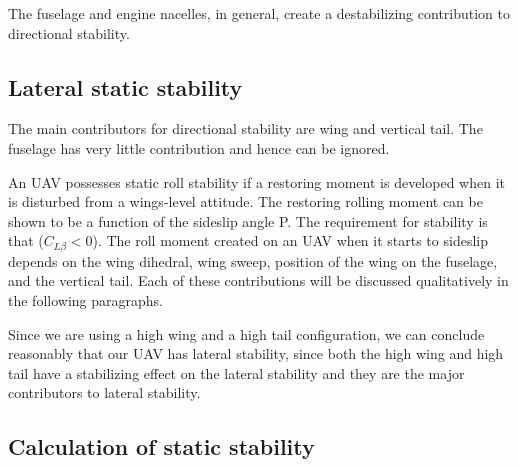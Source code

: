 \documentclass[12 pt]{article}
\begin{document}
{{The fuselage and engine nacelles, in general, create a destabilizing contribution to directional stability.

\subsection{Lateral static stability}

The main contributors for directional stability are wing and vertical tail. The fuselage has very little contribution and hence can be ignored.

An UAV possesses static roll stability if a restoring moment is developed when
it is disturbed from a wings-level attitude. The restoring rolling moment can be shown to be a function of the sideslip angle P. The requirement for stability is that ($C_{L\beta} < 0$). The roll moment created on an UAV when it starts to sideslip depends on the wing dihedral, wing sweep, position of the wing on the fuselage, and the vertical tail. Each of these contributions will be discussed qualitatively in the following paragraphs. 

Since we are using a high wing and a high tail configuration, we can conclude reasonably that our UAV has lateral stability, since both the high wing and high tail have a stabilizing effect on the lateral stability and they are the major contributors to lateral stability.

\newpage

\subsection{Calculation of static stability}
}}
\end{document}
